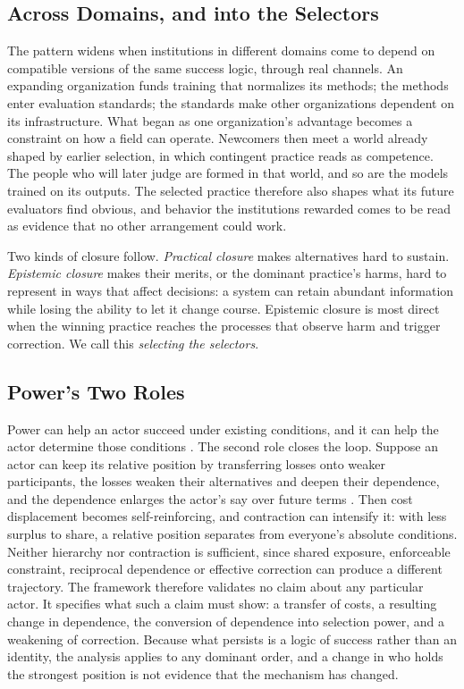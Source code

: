 \documentclass[letterpaper]{article} %
\theoremstyle{definition}
\begin{document}
\subsection{Across Domains, and into the Selectors}

The pattern widens when institutions in different domains come to depend on compatible versions of the same success logic, through real channels. An expanding organization funds training that normalizes its methods; the methods enter evaluation standards; the standards make other organizations dependent on its infrastructure. What began as one organization's advantage becomes a constraint on how a field can operate. Newcomers then meet a world already shaped by earlier selection, in which contingent practice reads as competence. The people who will later judge are formed in that world, and so are the models trained on its outputs. The selected practice therefore also shapes what its future evaluators find obvious, and behavior the institutions rewarded comes to be read as evidence that no other arrangement could work.

Two kinds of closure follow. \emph{Practical closure} makes alternatives hard to sustain. \emph{Epistemic closure} makes their merits, or the dominant practice's harms, hard to represent in ways that affect decisions: a system can retain abundant information while losing the ability to let it change course. Epistemic closure is most direct when the winning practice reaches the processes that observe harm and trigger correction. We call this \emph{selecting the selectors}.

\subsection{Power's Two Roles}

Power can help an actor succeed under existing conditions, and it can help the actor determine those conditions \citep{strange1988,lukes2005}. The second role closes the loop. Suppose an actor can keep its relative position by transferring losses onto weaker participants, the losses weaken their alternatives and deepen their dependence, and the dependence enlarges the actor's say over future terms \citep{farrell2019}. Then cost displacement becomes self-reinforcing, and contraction can intensify it: with less surplus to share, a relative position separates from everyone's absolute conditions. Neither hierarchy nor contraction is sufficient, since shared exposure, enforceable constraint, reciprocal dependence or effective correction can produce a different trajectory. The framework therefore validates no claim about any particular actor. It specifies what such a claim must show: a transfer of costs, a resulting change in dependence, the conversion of dependence into selection power, and a weakening of correction. Because what persists is a logic of success rather than an identity, the analysis applies to any dominant order, and a change in who holds the strongest position is not evidence that the mechanism has changed.
\end{document}

